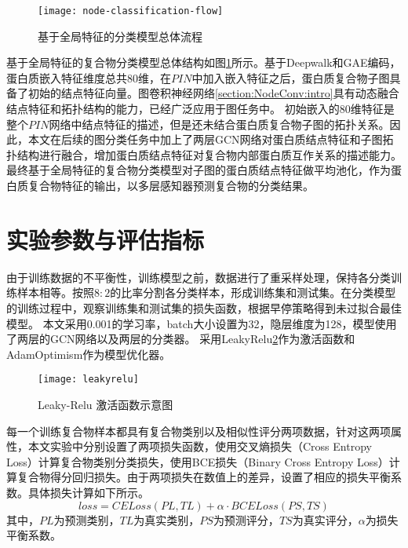 \begin{figure}[htbp]
    \centering
    \texttt{[image: node-classification-flow]}
    \caption{基于全局特征的分类模型总体流程}
    \label{fig:node-classification-flow}
\end{figure}
基于全局特征的复合物分类模型总体结构如图\ref{fig:node-classification-flow}所示。基于Deepwalk和GAE编码，蛋白质嵌入特征维度总共80维，在$PIN$中加入嵌入特征之后，蛋白质复合物子图具备了初始的结点特征向量。图卷积神经网络\ref{section:NodeConv:intro}具有动态融合结点特征和拓扑结构的能力，已经广泛应用于图任务中。
初始嵌入的80维特征是整个$PIN$网络中结点特征的描述，但是还未结合蛋白质复合物子图的拓扑关系。因此，本文在后续的图分类任务中加上了两层GCN网络对蛋白质结点特征和子图拓扑结构进行融合，增加蛋白质结点特征对复合物内部蛋白质互作关系的描述能力。
最终基于全局特征的复合物分类模型对子图的蛋白质结点特征做平均池化，作为蛋白质复合物特征的输出，以多层感知器预测复合物的分类结果。

\section{实验参数与评估指标}
\label{section:NodeConv:allExperienceDesign}
由于训练数据的不平衡性，训练模型之前，数据进行了重采样处理，保持各分类训练样本相等。按照$8:2$的比率分割各分类样本，形成训练集和测试集。在分类模型的训练过程中，观察训练集和测试集的损失函数，根据早停策略得到未过拟合最佳模型。
本文采用0.001的学习率，batch大小设置为32，隐层维度为128，模型使用了两层的GCN网络以及两层的分类器。
采用LeakyRelu\ref{fig:leakyrelu}作为激活函数和AdamOptimism作为模型优化器。

\begin{figure}[htbp]
    \centering
    \texttt{[image: leakyrelu]}
    \caption{Leaky-Relu 激活函数示意图}
    \label{fig:leakyrelu}
\end{figure}

每一个训练复合物样本都具有复合物类别以及相似性评分两项数据，针对这两项属性，本文实验中分别设置了两项损失函数，使用交叉熵损失（Cross Entropy Loss）计算复合物类别分类损失，使用BCE损失（Binary Cross Entropy Loss）计算复合物得分回归损失。由于两项损失在数值上的差异，设置了相应的损失平衡系数。具体损失计算如下所示。
\begin{equation}
    \label{equ:loss}
    loss=CELoss(PL,TL)+\alpha \cdot BCELoss(PS,TS)
\end{equation}
其中，$PL$为预测类别，$TL$为真实类别，$PS$为预测评分，$TS$为真实评分，$\alpha$为损失平衡系数。

